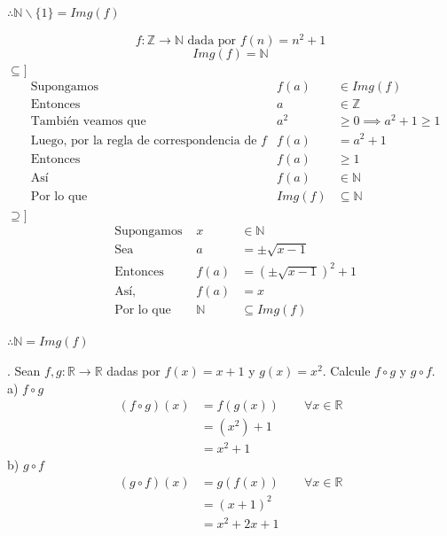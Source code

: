\documentclass[letterpaper]{article}
\newcommand{\R}{\mathds{R}}
\newcommand{\Z}{\mathds{Z}}
\newcommand{\N}{\mathds{N}}
\renewcommand{\*}{\cdot}
\theoremstyle{definition}
\begin{document}
\begin{center}
	$ \therefore \N\backslash\{ 1 \} = Img(f) $
\end{center}
\[ f : \Z \to \N \text{ dada por } f(n) = n^2 + 1  \]
\[  Img(f) = \N \]
$ \subseteq] $
\begin{align*}
&\text{Supongamos }	& f(a) &\in Img(f) \\
&\text{Entonces }	& a &\in \Z \\
&\text{También veamos que }	& a^2 &\geq 0 \implies a^2 + 1 \geq 1   \\
&\text{Luego, por la regla de correspondencia de  }f	& f(a) &= a^2 + 1 \\
&\text{Entonces  }	& f(a) &\geq 1\\
&\text{Así  }	& f(a) &\in  \N\\
&\text{Por lo que  }	& Img(f) &\subseteq  \N
\end{align*}
$ \supseteq] $
\begin{align*}
&\text{Supongamos }	& x &\in \N \\
&\text{Sea }	& a &= \pm \sqrt{x - 1} \\
&\text{Entonces }	& f(a) &= (\pm \sqrt{x - 1})^2 + 1 \\
&\text{Así,  }	& f(a) &= x\\
&\text{Por lo que  }	& \N &\subseteq Img(f)
\end{align*}
\begin{center}
	$ \therefore \N= Img(f) $
\end{center}
. Sean $ f, g: \R \to \R $ dadas por $ f(x) = x + 1 $ y $ g(x) = x^2 $. Calcule $ f \circ g $ y $ g \circ f $.\\

\noindent a) $ f \circ g $
\begin{align*}
	(f \circ g)(x) &= f(g(x)) \qquad \forall x \in \R\\
	& = (x^2) + 1\\
	& = x^2 + 1
\end{align*}
b) $ g \circ f $
\begin{align*}
	(g \circ f)(x) &= g(f(x)) \qquad \forall x \in \R\\
	& = (x+ 1)^2\\
	& = x^2 + 2x + 1
\end{align*}
\end{document}
